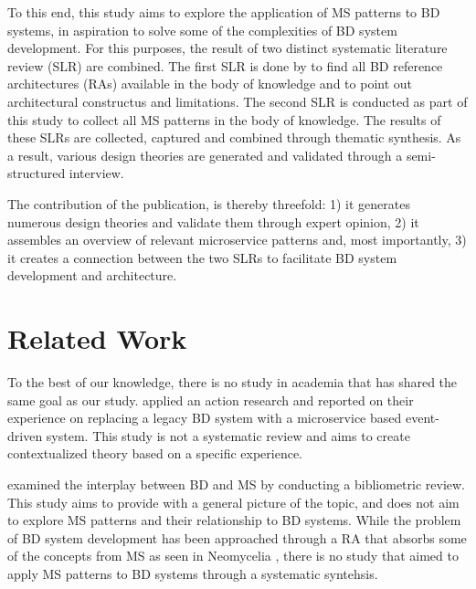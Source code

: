 \documentclass[a4paper,11pt,article,oneside]{memoir}
\begin{document}
To this end, this study aims to explore the application of MS patterns to BD systems, in aspiration to solve some of the complexities of BD system development. For this purposes, the result of two distinct systematic literature review (SLR) are combined. The first SLR is done by \citet{ataei2022state} to find all BD reference architectures (RAs) available in the body of knowledge and to point out architectural constructus and limitations. The second SLR is conducted as part of this study to collect all MS patterns in the body of knowledge. The results of these SLRs are collected, captured and combined through thematic synthesis. As a result, various design theories are generated and validated through a semi-structured interview.



The contribution of the publication, is thereby threefold: 
1) it generates numerous design theories and validate them through expert opinion, 2) it assembles an overview of relevant microservice patterns and, most importantly, 3) it creates a connection between the two SLRs to facilitate BD system development and architecture.


\chapter{Related Work}

To the best of our knowledge, there is no study in academia that has shared the same goal as our study. \citet{laigner2020monolithic} applied an action research and reported on their experience on replacing a legacy BD system with a microservice based event-driven system. This study is not a systematic review and aims to create contextualized theory based on a specific experience.


\citet{staegemann2021examining} examined the interplay between BD and MS by conducting a bibliometric review. This study aims to provide with a general picture of the topic, and does not aim to explore MS patterns and their relationship to BD systems.  While the problem of BD system development has been approached through a RA that absorbs some of the concepts from MS as seen in Neomycelia \citep{ataei2021neomycelia}, there is no study that aimed to apply MS patterns to BD systems through a systematic syntehsis.
\end{document}
